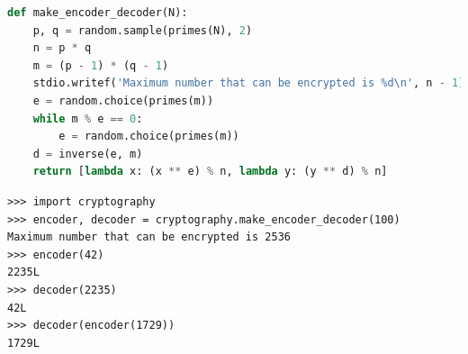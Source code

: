 \documentclass[8pt,a4paper,compress]{beamer}
\begin{document}
\begin{frame}[fragile]
\pause

\begin{lstlisting}[language=Python,style=focusin]
def make_encoder_decoder(N):
    p, q = random.sample(primes(N), 2)
    n = p * q
    m = (p - 1) * (q - 1)
    stdio.writef('Maximum number that can be encrypted is %d\n', n - 1)
    e = random.choice(primes(m))
    while m % e == 0:
        e = random.choice(primes(m))
    d = inverse(e, m)
    return [lambda x: (x ** e) % n, lambda y: (y ** d) % n]
\end{lstlisting}

\pause\bigskip

\begin{lstlisting}[language={},style=focusin]
>>> import cryptography
>>> encoder, decoder = cryptography.make_encoder_decoder(100)
Maximum number that can be encrypted is 2536
>>> encoder(42)
2235L
>>> decoder(2235)
42L
>>> decoder(encoder(1729))
1729L
\end{lstlisting}
\end{frame}
\end{document}
